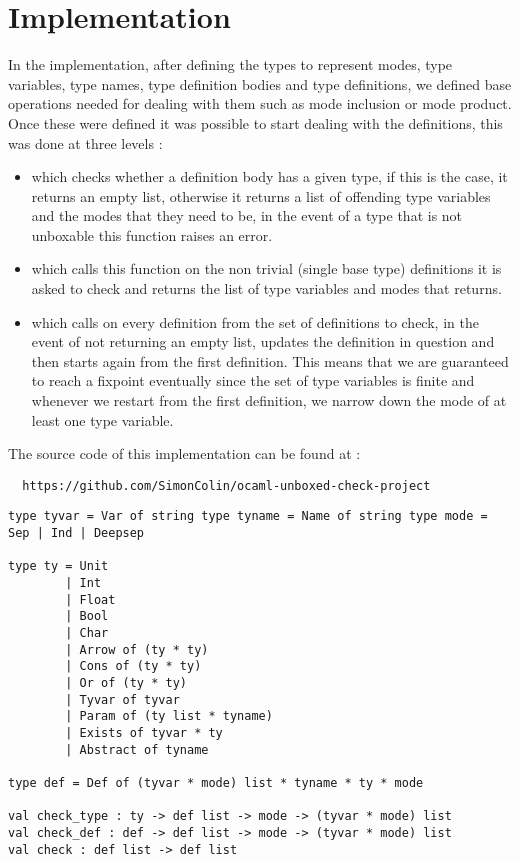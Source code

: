 \documentclass[a4]{article}
\begin{document}
\section{Implementation}

In the implementation, after defining the types to represent modes, type variables, type names, type definition bodies and type definitions, we defined base operations needed for dealing with them such as mode inclusion or mode product. Once these were defined it was possible to start dealing with the definitions, this was done at three levels :
\begin{itemize}
\item {} which checks whether a definition body has a given type, if this is the case, it returns an empty list, otherwise it returns a list of offending type variables and the modes that they need to be, in the event of a type that is not unboxable this function raises an error.
\item {} which calls this function on the non trivial (single base type) definitions it is asked to check and returns the list of type variables and modes that  returns.
\item {} which calls  on every definition from the set of definitions to check, in the event of  not returning an empty list,  updates the definition in question and then starts again from the first definition. This means that we are guaranteed to reach a fixpoint eventually since the set of type variables is finite and whenever we restart from the first definition, we narrow down the mode of at least one type variable.
\end{itemize}

The source code of this implementation can be found at :
\begin{lstlisting}
  https://github.com/SimonColin/ocaml-unboxed-check-project
\end{lstlisting}

\begin{lstlisting}
type tyvar = Var of string type tyname = Name of string type mode =
Sep | Ind | Deepsep

type ty = Unit
        | Int
        | Float
        | Bool
        | Char
        | Arrow of (ty * ty)
        | Cons of (ty * ty)
        | Or of (ty * ty)
        | Tyvar of tyvar
        | Param of (ty list * tyname)
        | Exists of tyvar * ty
        | Abstract of tyname

type def = Def of (tyvar * mode) list * tyname * ty * mode

val check_type : ty -> def list -> mode -> (tyvar * mode) list
val check_def : def -> def list -> mode -> (tyvar * mode) list
val check : def list -> def list
\end{lstlisting}
\end{document}
